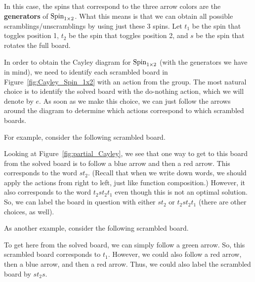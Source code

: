\noindent In this case, the spins that correspond to the three arrow colors are the \textbf{generators} of $\operatorname{Spin}_{1\times 2}$.  What this means is that we can obtain all possible scramblings/unscramblings by using just these 3 spins.  Let $t_1$ be the spin that toggles position 1, $t_2$ be the spin that toggles position 2, and $s$ be the spin that rotates the full board.  

In order to obtain the Cayley diagram for $\operatorname{Spin}_{1\times 2}$ (with the generators we have in mind), we need to identify each scrambled board in Figure~\ref{fig:Cayley_Spin_1x2} with an action from the group.  The most natural choice is to identify the solved board with the do-nothing action, which we will denote by $e$.  As soon as we make this choice, we can just follow the arrows around the diagram to determine which actions correspond to which scrambled boards.  

For example, consider the following scrambled board.
\begin{center}
\end{center}
Looking at Figure~\ref{fig:partial_Cayley}, we see that one way to get to this board from the solved board is to follow a blue arrow and then a red arrow.  This corresponds to the word $st_2$.  (Recall that when we write down words, we should apply the actions from right to left, just like function composition.) However, it also corresponds to the word $t_2st_2t_1$ even though this is not an optimal solution.  So, we can label the board in question with either $st_2$ or $t_2st_2t_1$ (there are other choices, as well).

As another example, consider the following scrambled board.
\begin{center}
\end{center}
To get here from the solved board, we can simply follow a green arrow. So, this scrambled board corresponds to $t_1$.  However, we could also follow a red arrow, then a blue arrow, and then a red arrow. Thus, we could also label the scrambled board by $s t_2 s$.

